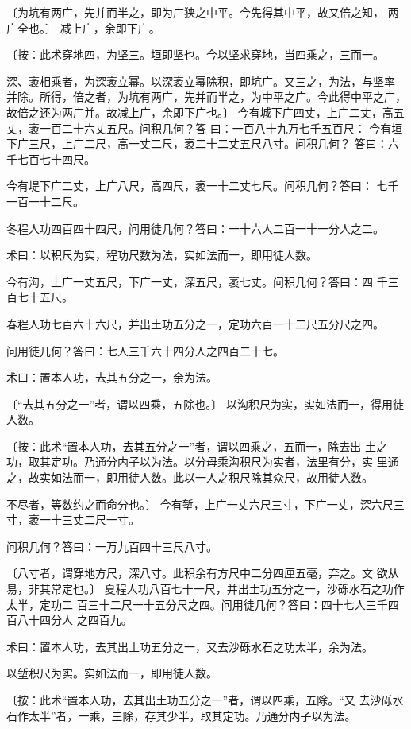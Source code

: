 \documentclass[12pt,UTF8]{ctexbook}
\begin{document}
〔为坑有两广，先并而半之，即为广狭之中平。今先得其中平，故又倍之知， 两广全也。〕 减上广，余即下广。

〔按：此术穿地四，为坚三。垣即坚也。今以坚求穿地，当四乘之，三而一。

深、袤相乘者，为深袤立幂。以深袤立幂除积，即坑广。又三之，为法，与坚率 并除。所得，倍之者，为坑有两广，先并而半之，为中平之广。今此得中平之广， 故倍之还为两广并。故减上广，余即下广也。〕 今有城下广四丈，上广二丈，高五丈，袤一百二十六丈五尺。问积几何？答 曰：一百八十九万七千五百尺： 今有垣下广三尺，上广二尺，高一丈二尺，袤二十二丈五尺八寸。问积几何？ 答曰：六千七百七十四尺。

今有堤下广二丈，上广八尺，高四尺，袤一十二丈七尺。问积几何？答曰： 七千一百一十二尺。

冬程人功四百四十四尺，问用徒几何？答曰：一十六人二百一十一分人之二。

术曰：以积尺为实，程功尺数为法，实如法而一，即用徒人数。

今有沟，上广一丈五尺，下广一丈，深五尺，袤七丈。问积几何？答曰：四 千三百七十五尺。

春程人功七百六十六尺，并出土功五分之一，定功六百一十二尺五分尺之四。

问用徒几何？答曰：七人三千六十四分人之四百二十七。

术曰：置本人功，去其五分之一，余为法。

〔“去其五分之一”者，谓以四乘，五除也。〕 以沟积尺为实，实如法而一，得用徒人数。

〔按：此术“置本人功，去其五分之一”者，谓以四乘之，五而一，除去出 土之功，取其定功。乃通分内子以为法。以分母乘沟积尺为实者，法里有分，实 里通之，故实如法而一，即用徒人数。此以一人之积尺除其众尺，故用徒人数。

不尽者，等数约之而命分也。〕 今有堑，上广一丈六尺三寸，下广一丈，深六尺三寸，袤一十三丈二尺一寸。

问积几何？答曰：一万九百四十三尺八寸。

〔八寸者，谓穿地方尺，深八寸。此积余有方尺中二分四厘五毫，弃之。文 欲从易，非其常定也。〕 夏程人功八百七十一尺，并出土功五分之一，沙砾水石之功作太半，定功二 百三十二尺一十五分尺之四。问用徒几何？答曰：四十七人三千四百八十四分人 之四百九。

术曰：置本人功，去其出土功五分之一，又去沙砾水石之功太半，余为法。

以堑积尺为实。实如法而一，即用徒人数。

〔按：此术“置本人功，去其出土功五分之一”者，谓以四乘，五除。“又 去沙砾水石作太半”者，一乘，三除，存其少半，取其定功。乃通分内子以为法。
\end{document}
